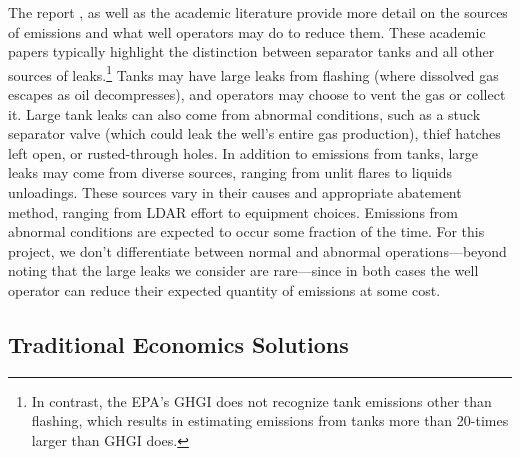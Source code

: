 \documentclass[12pt,oneside,letterpaper]{article}
\theoremstyle{definition}
\begin{document}
\begin{refsection}
The report \textcite{ICF-abatement:2014}, as well as the academic literature
\textcite{%
Lyon/Alvarez/Zavala-Araiza/Brandt/Jackson/Hamburg:2016,
Rutherford/etal:2021,
Ravikumar/etal:2020,
Robertson/etal:2020,
}
provide more detail on the sources of emissions and what well operators may do to reduce them.
These academic papers typically highlight the distinction between separator tanks and all other sources of leaks.\footnote{%
In contrast, the \gls{EPA}'s \gls{GHGI} does not recognize tank emissions other than flashing, which results in \textcite{Rutherford/etal:2021} estimating emissions from tanks more than 20-times larger than \gls{GHGI} does.
}
Tanks may have large leaks from flashing (where dissolved gas escapes as oil decompresses), and operators may choose to vent the gas or collect it.
Large tank leaks can also come from abnormal conditions, such as a stuck separator valve (which could leak the well's entire gas production), thief hatches left open, or rusted-through holes.
In addition to emissions from tanks, large leaks may come from diverse sources, ranging from unlit flares to liquids unloadings.
These sources vary in their causes and appropriate abatement method, ranging from \gls{LDAR} effort to equipment choices.
Emissions from abnormal conditions are expected to occur some fraction of the time.
For this project, we don't differentiate between normal and abnormal operations---beyond noting that the large leaks we consider are rare---since in both cases the well operator can reduce their expected quantity of emissions at some cost.

\subsection{Traditional Economics Solutions}
\label{sec:traditional-economics-solutions}


\end{refsection}
\end{document}
